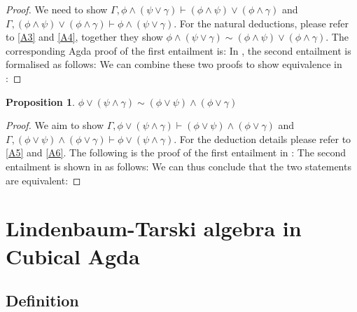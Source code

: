 \documentclass[titlepage]{article}
\newtheorem{proposition}{Proposition}
\begin{document}
\begin{proof}
    We need to show $\Gamma, \phi \wedge (\psi \vee \gamma) \vdash (\phi \wedge \psi) \vee (\phi \wedge \gamma)$ and $\Gamma, (\phi \wedge \psi) \vee (\phi \wedge \gamma) \vdash \phi \wedge (\psi \vee \gamma)$. For the natural deductions, please refer to \ref{A3} and \ref{A4}, together they show $\phi \wedge (\psi \vee \gamma) \sim (\phi \wedge \psi) \vee (\phi \wedge \gamma)$. The corresponding Agda proof of the first entailment is:
    In \Agda, the second entailment is formalised as follows:
    We can combine these two proofs to show equivalence in \Agda:
\end{proof}

\begin{proposition}
    $\phi \vee (\psi \wedge \gamma) \sim (\phi \vee \psi) \wedge (\phi \vee \gamma)$
\end{proposition}

\begin{proof}
    We aim to show $\Gamma, \phi \vee (\psi \wedge \gamma) \vdash (\phi \vee \psi) \wedge (\phi \vee \gamma)$ and $\Gamma, (\phi \vee \psi) \wedge (\phi \vee \gamma) \vdash \phi \vee (\psi \wedge \gamma)$. For the deduction details please refer to \ref{A5} and \ref{A6}. The following is the proof of the first entailment in \Agda:
    The second entailment is shown in \Agda as follows:
    We can thus conclude that the two statements are equivalent:
\end{proof}





\section{Lindenbaum-Tarski algebra in Cubical Agda}

\subsection{Definition}
\end{document}
